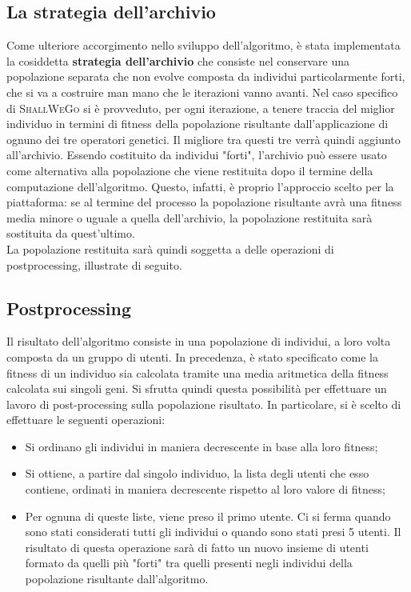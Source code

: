         \subsection{La strategia dell'archivio}
            Come ulteriore accorgimento nello sviluppo dell'algoritmo, è stata implementata la cosiddetta \textbf{strategia dell'archivio} che consiste nel conservare una popolazione separata che non evolve composta da individui particolarmente forti, che si va a costruire man mano che le iterazioni vanno avanti. Nel caso specifico di \textsc{ShallWeGo} si è provveduto, per ogni iterazione, a tenere traccia del miglior individuo in termini di fitness della popolazione risultante dall'applicazione di ognuno dei tre operatori genetici. Il migliore tra questi tre verrà quindi aggiunto all'archivio.
            Essendo costituito da individui "forti", l'archivio può essere usato come alternativa alla popolazione che viene restituita dopo il termine della computazione dell'algoritmo. Questo, infatti, è proprio l'approccio scelto per la piattaforma: se al termine del processo la popolazione risultante avrà una fitness media minore o uguale a quella dell'archivio, la popolazione restituita sarà sostituita da quest'ultimo. \\
            La popolazione restituita sarà quindi soggetta a delle operazioni di postprocessing, illustrate di seguito.

        \subsection{Postprocessing}
            Il risultato dell'algoritmo consiste in una popolazione di individui, a loro volta composta da un gruppo di utenti. In precedenza, è stato specificato come la fitness di un individuo sia calcolata tramite una media aritmetica della fitness calcolata sui singoli geni. Si sfrutta quindi questa possibilità per effettuare un lavoro di post-processing sulla popolazione risultato. In particolare, si è scelto di effettuare le seguenti operazioni:

            \begin{itemize}
                \item Si ordinano gli individui in maniera decrescente in base alla loro fitness;
                \item Si ottiene, a partire dal singolo individuo, la lista degli utenti che esso contiene, ordinati in maniera decrescente rispetto al loro valore di fitness;
                \item Per ognuna di queste liste, viene preso il primo utente. Ci si ferma quando sono stati considerati tutti gli individui o quando sono stati presi 5 utenti. Il risultato di questa operazione sarà di fatto un nuovo insieme di utenti formato da quelli più "forti" tra quelli presenti negli individui della popolazione risultante dall'algoritmo.
            \end{itemize}

